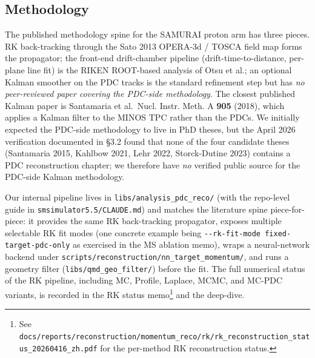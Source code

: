 \documentclass[a4paper, 11pt]{article}
\begin{document}
\subsection{Methodology}
The published methodology spine for the SAMURAI proton arm has three pieces. RK back-tracking through the Sato 2013 OPERA-3d / TOSCA field map forms the propagator; the front-end drift-chamber pipeline (drift-time-to-distance, per-plane line fit) is the RIKEN ROOT-based analysis of Otsu et al.; an optional Kalman smoother on the PDC tracks is the standard refinement step but has \emph{no peer-reviewed paper covering the PDC-side methodology}. The closest published Kalman paper is Santamaria et al.\ Nucl. Instr. Meth. A \textbf{905} (2018), which applies a Kalman filter to the MINOS TPC rather than the PDCs. We initially expected the PDC-side methodology to live in PhD theses, but the April 2026 verification documented in §3.2 found that none of the four candidate theses (Santamaria 2015, Kahlbow 2021, Lehr 2022, Storck-Dutine 2023) contains a PDC reconstruction chapter; we therefore have \emph{no} verified public source for the PDC-side Kalman methodology.

Our internal pipeline lives in \texttt{libs/analysis\_pdc\_reco/} (with the repo-level guide in \texttt{smsimulator5.5/CLAUDE.md}) and matches the literature spine piece-for-piece: it provides the same RK back-tracking propagator, exposes multiple selectable RK fit modes (one concrete example being \texttt{-{}-rk-fit-mode fixed-target-pdc-only} as exercised in the MS ablation memo), wraps a neural-network backend under \texttt{scripts/reconstruction/nn\_target\_momentum/}, and runs a geometry filter (\texttt{libs/qmd\_geo\_filter/}) before the fit. The full numerical status of the RK pipeline, including MC, Profile, Laplace, MCMC, and MC-PDC variants, is recorded in the RK status memo\footnote{\label{fn:rkstatus}See \texttt{docs/reports/reconstruction/momentum\_reco/rk/rk\_reconstruction\_status\_20260416\_zh.pdf} for the per-method RK reconstruction status.} and the deep-dive.
\end{document}
